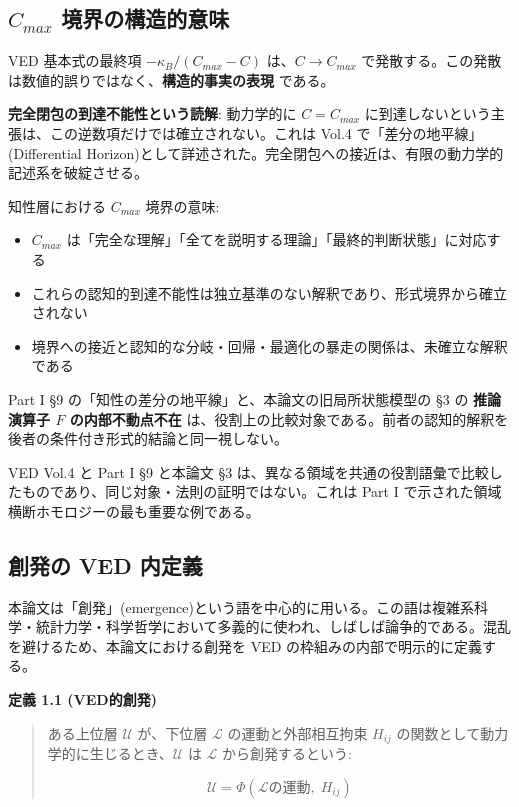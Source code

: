 \bigskip


\subsection{$C_{max}$ 境界の構造的意味}


VED 基本式の最終項 $-\kappa_B/(C_{max} - C)$ は、$C \to C_{max}$ で発散する。この発散は数値的誤りではなく、\textbf{構造的事実の表現} である。

\textbf{完全閉包の到達不能性という読解}: 動力学的に $C = C_{max}$ に到達しないという主張は、この逆数項だけでは確立されない。これは Vol.4 で「差分の地平線」(Differential Horizon)として詳述された。完全閉包への接近は、有限の動力学的記述系を破綻させる。

知性層における $C_{max}$ 境界の意味:

\begin{itemize}
\item $C_{max}$ は「完全な理解」「全てを説明する理論」「最終的判断状態」に対応する
\item これらの認知的到達不能性は独立基準のない解釈であり、形式境界から確立されない
\item 境界への接近と認知的な分岐・回帰・最適化の暴走の関係は、未確立な解釈である
\end{itemize}


Part I \S{}9 の「知性の差分の地平線」と、本論文の旧局所状態模型の \S{}3 の \textbf{推論演算子 $F$ の内部不動点不在} は、役割上の比較対象である。前者の認知的解釈を後者の条件付き形式的結論と同一視しない。

VED Vol.4 と Part I \S{}9 と本論文 \S{}3 は、異なる領域を共通の役割語彙で比較したものであり、同じ対象・法則の証明ではない。これは Part I で示された領域横断ホモロジーの最も重要な例である。

\bigskip


\subsection{創発の VED 内定義}


本論文は「創発」(emergence)という語を中心的に用いる。この語は複雑系科学・統計力学・科学哲学において多義的に使われ、しばしば論争的である。混乱を避けるため、本論文における創発を VED の枠組みの内部で明示的に定義する。

\textbf{定義 1.1 (VED的創発)}

\begin{quote}
ある上位層 $\mathcal{U}$ が、下位層 $\mathcal{L}$ の運動と外部相互拘束 $H_{ij}$ の関数として動力学的に生じるとき、$\mathcal{U}$ は $\mathcal{L}$ から創発するという:

$$
\mathcal{U} = \Phi(\mathcal{L}\text{の運動}, \; H_{ij})
$$
\end{quote}



